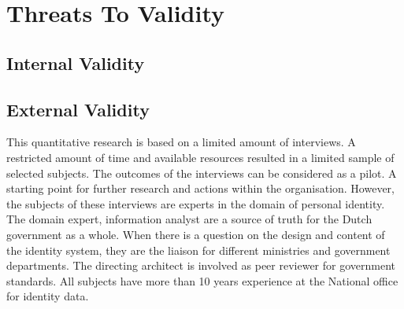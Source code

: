 \chapter{Threats To Validity}\label{sec:threats}


\section{Internal Validity}

\section{External Validity}
This quantitative research is based on a limited amount of interviews. A restricted amount of time and available resources resulted in a limited sample of selected subjects. The outcomes of the interviews can be considered as a pilot. A starting point for further research and actions within the organisation. 
However, the subjects of these interviews are experts in the domain of personal identity. The domain expert, information analyst  are a source of truth for the Dutch government as a whole. When there is a question on the design and content of the identity system, they are the liaison for different ministries and government departments. The directing architect is involved as peer reviewer for government standards. All subjects have more than 10 years experience at the National office for identity data.  


